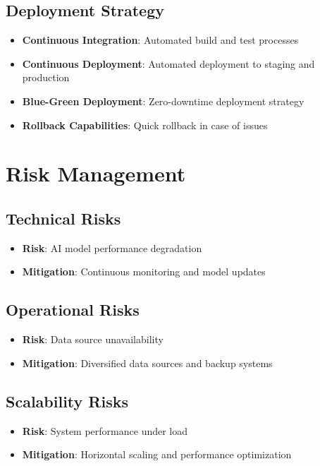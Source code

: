 \documentclass[business]{../templates/infraradar-main}
\begin{document}
\subsection{Deployment Strategy}
\begin{itemize}
    \item \textbf{Continuous Integration}: Automated build and test processes
    \item \textbf{Continuous Deployment}: Automated deployment to staging and production
    \item \textbf{Blue-Green Deployment}: Zero-downtime deployment strategy
    \item \textbf{Rollback Capabilities}: Quick rollback in case of issues
\end{itemize}

\section{Risk Management}

\subsection{Technical Risks}
\begin{itemize}
    \item \textbf{Risk}: AI model performance degradation
    \item \textbf{Mitigation}: Continuous monitoring and model updates
\end{itemize}

\subsection{Operational Risks}
\begin{itemize}
    \item \textbf{Risk}: Data source unavailability
    \item \textbf{Mitigation}: Diversified data sources and backup systems
\end{itemize}

\subsection{Scalability Risks}
\begin{itemize}
    \item \textbf{Risk}: System performance under load
    \item \textbf{Mitigation}: Horizontal scaling and performance optimization
\end{itemize}
\end{document}
